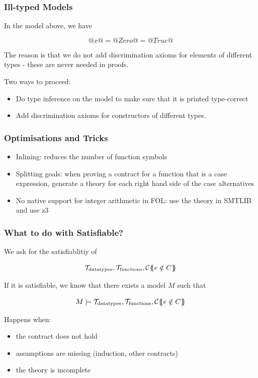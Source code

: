 \documentclass[serif,professionalfont]{beamer}
\begin{document}
\begin{frame}
  \frametitle{Ill-typed Models}
    In the model above, we have

    $$@x@ = @Zero@ = @True@$$

    The reason is that we do not add discrimination axioms for
    elements of different types - these are never needed in proofs.

    Two ways to proceed:

    \begin{itemize}

      \item Do type inference on the model to make sure that it is
        printed type-correct

      \item Add discrimination axioms for constructors of different
        types.

    \end{itemize}
\end{frame}

\begin{frame}[fragile]
  \frametitle{Optimisations and Tricks}

    \begin{itemize}

      \item Inlining: reduces the number of function symbols

      \item Splitting goals: when proving a contract for a function
        that is a case expression, generate a theory for each right
        hand side of the case alternatives

      \item No native support for integer arithmetic in FOL: use
        the theory in SMTLIB and use z3
    \end{itemize}

\end{frame}

\begin{frame}[fragile]
  \frametitle{What to do with Satisfiable?}

  We ask for the satisfiablitiy of

  $$
    \mathcal{T}_{\text{datatypes}}, \mathcal{T}_{\text{functions}} ,
    {\cal C}\{\!\!\{e \notin C\}\!\!\}
  $$

  If it is satisfiable, we know that there exists a model $M$ such that

  $$
    M \models
    \mathcal{T}_{\text{datatypes}},
    \mathcal{T}_{\text{functions}} ,
    {\cal C}\{\!\!\{e \notin C\}\!\!\}
  $$

  Happens when:
    \begin{itemize}
      \item the contract does not hold

      \item assumptions are missing (induction, other contracts)

      \item the theory is incomplete
    \end{itemize}

\end{frame}
\end{document}
